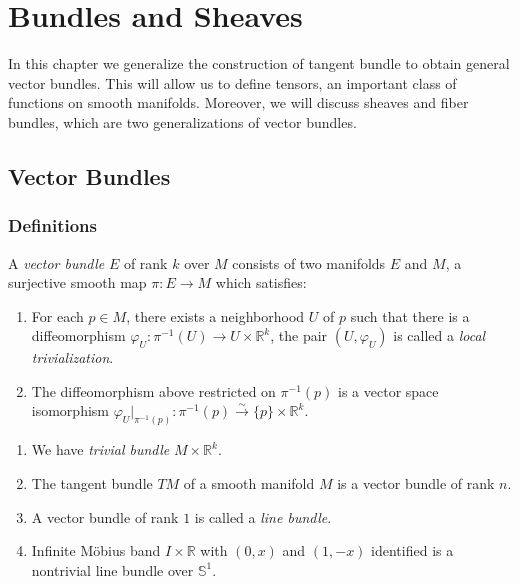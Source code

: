 \chapter{Bundles and Sheaves}

In this chapter we generalize the construction of tangent bundle to obtain general vector bundles.
This will allow us to define tensors, an important class of functions on smooth manifolds.
Moreover, we will discuss sheaves and fiber bundles, which are two generalizations of vector bundles.

\section{Vector Bundles}

\subsection*{Definitions}

\begin{defn}
    A \emph{vector bundle} $E$ of rank $k$ over $M$ consists of two manifolds $E$ and $M$, a surjective smooth map $\pi:E\to M$ which satisfies:
    \begin{enumerate}[(1)]
        \item For each $p\in M$, there exists a neighborhood $U$ of $p$ such that there is a diffeomorphism $\varphi_U:\pi^{-1}(U)\to U\times\mathbb{R}^k$, the pair $(U,\varphi_U)$ is called a \emph{local trivialization}.
        \item The diffeomorphism above restricted on $\pi^{-1}(p)$ is a vector space isomorphism $\varphi_U|_{\pi^{-1}(p)}:\pi^{-1}(p)\xrightarrow{\sim}\{p\}\times\mathbb{R}^k$.
    \end{enumerate}
\end{defn}

\begin{eg}\label{eg2.1}
    \begin{enumerate}[(1)]
        \item We have \emph{trivial bundle} $M\times\mathbb{R}^k$.
        \item The tangent bundle $TM$ of a smooth manifold $M$ is a vector bundle of rank $n$.
        \item A vector bundle of rank $1$ is called a \emph{line bundle}.
        \item Infinite M\"{o}bius band $I\times\mathbb{R}$ with $(0,x)$ and $(1,-x)$ identified is a nontrivial line bundle over $\mathbb{S}^1$.
    \end{enumerate}
\end{eg}

